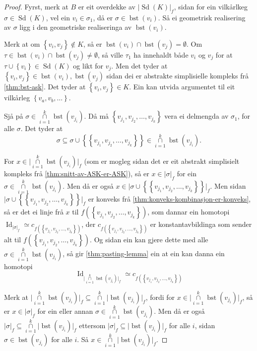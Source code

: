 \documentclass[a4paper, 12pt, norsk]{article}
\theoremstyle{plain}
\theoremstyle{definition}
\newcommand{\intersect}{ \mathop{\cap}\limits }
\newcommand{\union}{ \mathop{\cup}\limits }
\newcommand{\gr}[1]{ \lvert #1 \rvert } %
\newcommand{\set}[1]{ \left\{ #1 \right\} } %
\DeclareMathOperator{\Sd}{Sd} %
\DeclareMathOperator{\bst}{bst} %
\DeclareMathOperator{\Id}{Id} %
\begin{document}
\begin{proof}
	Fyrst, merk at \( B \) er eit overdekke av \( \gr{\Sd(K)}_f \), sidan for ein vilkårlkeg \( \sigma \in \Sd(K) \), vel ein \( v_i \in \sigma_1 \), då er \( \sigma \in \bst(v_i) \). Så ei geometrisk realisering av \( \sigma \) ligg i den geometriske realiseringa av \( \bst(v_i) \).

	Merk at om \( \set{v_i, v_j} \not\in K \), så er \( \bst(v_i) \intersect \bst(v_j) = \emptyset \). Om \( \tau \in \bst(v_i) \intersect \bst(v_j) \neq \emptyset \), så ville \( \tau_1 \) ha innehaldt både \( v_i \) og \( v_j \) for at \( \tau \union \set{v_i} \in \Sd(K) \) og likt for \( v_j \). Men det tyder at \( \set{v_i, v_j} \in \bst(v_i), \bst(v_j) \) sidan dei er abstrakte simplisielle kompleks frå \autoref{thm:bst-ask}. Det tyder at \( \set{v_i, v_j} \in K \). Ein kan utvida argumentet til eit vilkårleg \( \set{v_a, v_b, \dots} \).

	Sjå på \( \sigma \in \intersect_{i = 1}^k \bst(v_{j_i}) \). Då må \( \set{v_{j_1}, v_{j_2}, \dots, v_{j_k}} \) vera ei delmengda av \( \sigma_1 \), for alle \( \sigma \). Det tyder at 
	\[ 
		\sigma \subseteq \sigma \union \set{\set{v_{j_1}, v_{j_2}, \dots, v_{j_k}}} \in \intersect_{i = 1}^k \bst(v_{j_i}).
	\]

	For \(x \in \gr{\intersect_{i = 1}^k \bst(v_{j_i})}_f \) (som er mogleg sidan det er eit abstrakt simplisielt kompleks frå \autoref{thm:snitt-av-ASK-er-ASK}), så er \( x \in \gr{\sigma}_f \) for ein \( \sigma \in \intersect_{i = 1}^k \bst(v_{j_i}) \). Men då er også \( x \in \gr{\sigma \union \set{\set{v_{j_1}, v_{j_2}, \dots, v_{j_k}}}}_f \). Men sidan \( \gr{\sigma \union \set{\set{v_{j_1}, v_{j_2}, \dots, v_{j_k}}}}_f \) er konveks frå \autoref{thm:konveks-kombinasjon-er-konveks}, så er det ei linje frå \( x \) til \( f(\set{v_{j_1}, v_{j_2}, \dots, v_{j_k}}) \), som dannar ein homotopi \( \Id_{\gr{\sigma}_f} \simeq c_{f(\set{v_{j_1}, v_{j_2}, \dots, v_{j_k}})} \), der \( c_{f(\set{v_{j_1}, v_{j_2}, \dots, v_{j_k}})} \) er konstantavbildinga som sender alt til \( f(\set{v_{j_1}, v_{j_2}, \dots, v_{j_k}}) \). Og sidan ein kan gjere dette med alle \( \sigma \in \intersect_{i = 1}^k \bst(v_{j_i}) \), så gir \autoref{thm:pasting-lemma} ein at ein kan danna ein homotopi
	\[ 
		\Id_{\gr{\intersect_{i = 1}^k \bst(v_{j_i})}_f} \simeq c_{f(\set{v_{j_1}, v_{j_2}, \dots, v_{j_k}})}
	\]

	Merk at \( \gr{\intersect_{i = 1}^k \bst(v_{j_i})}_f \subseteq \intersect_{i = 1}^k \gr{\bst(v_{j_i})}_f\), fordi for \( x \in \gr{\intersect_{i = 1}^k \bst(v_{j_i})}_f \), så er \( x \in \gr{\sigma}_f \) for ein eller annan \( \sigma \in \intersect_{i = 1}^k \bst(v_{j_i}) \). Men då er også \( \gr{\sigma}_f \subseteq \intersect_{i = 1}^k \gr{\bst(v_{j_i})}_f \) ettersom \( \gr{\sigma}_f \subseteq \gr{\bst(v_{j_i})}_f \) for alle \( i \), sidan \( \sigma \in \bst(v_{j_i}) \) for alle \( i \). Så \( x \in \intersect_{i = 1}^k \gr{\bst(v_{j_i})}_f \).


\end{proof}
\end{document}

